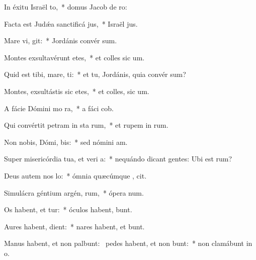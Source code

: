 \item In éxitu Israël  to,~* domus Jacob de  ro:
\item Facta est Judǽa sanctificá jus,~* Israël  jus.
\item Mare vi,  git:~* Jordánis convér  sum.
\item Montes exsultavérunt  etes,~* et colles sic  um.
\item Quid est tibi, mare,  ti:~* et tu, Jordánis, quia convér  sum?
\item Montes, exsultástis sic etes,~* et colles, sic  um.
\item A fácie Dómini mo  ra,~* a fáci  cob.
\item Qui convértit petram in sta rum,~* et rupem in  rum.
\item Non nobis, Dómi,  bis:~* sed nómini   am.
\item Super misericórdia tua, et veri a:~* nequándo dicant gentes: Ubi est  rum?
\item Deus autem nos  lo:~* ómnia quæcúmque , cit.
\item Simulácra géntium argén,  rum,~* ópera  num.
\item Os habent, et  tur:~* óculos habent,   bunt.
\item Aures habent,   dient:~* nares habent, et  bunt.
\item Manus habent, et non palbunt:~\pscross{} pedes habent, et non bunt:~* non clamábunt in  o.
